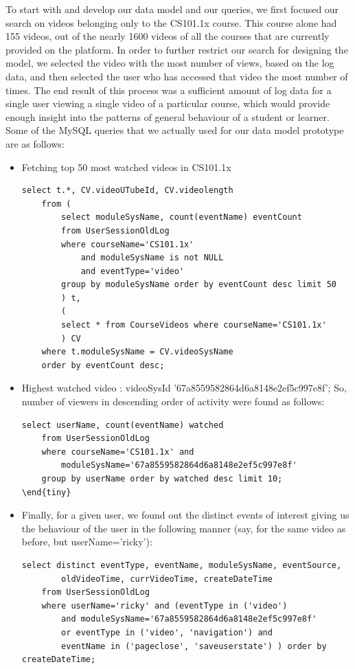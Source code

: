 \documentclass[16pt]{report}
\begin{document}
To start with and develop our data model and our queries, we first focused our search on videos belonging only to the CS101.1x course. This course alone had 155 videos, out of the nearly 1600 videos of all the courses that are currently provided on the platform. In order to further restrict our search for designing the model, we selected the video with the most number of views, based on the log data, and then selected the user who has accessed that video the most number of times. The end result of this process was a sufficient amount of log data for a single user viewing a single video of a particular course, which would provide enough insight into the patterns of general behaviour of a student or learner. \\

Some of the MySQL queries that we actually used for our data model prototype are as follows:

\begin{itemize}

\item Fetching top 50 most watched videos in CS101.1x
\begin{verbatim}
select t.*, CV.videoUTubeId, CV.videolength
	from ( 	
		select moduleSysName, count(eventName) eventCount
		from UserSessionOldLog
		where courseName='CS101.1x' 
			and moduleSysName is not NULL
			and eventType='video'
		group by moduleSysName order by eventCount desc limit 50
		) t,
		(
		select * from CourseVideos where courseName='CS101.1x'
		) CV
	where t.moduleSysName = CV.videoSysName
	order by eventCount desc;
\end{verbatim}


\item Highest watched video : videoSysId '67a8559582864d6a8148e2ef5c997e8f'; So, number of viewers in descending order of activity were found as follows:

\begin{verbatim}
select userName, count(eventName) watched
	from UserSessionOldLog
	where courseName='CS101.1x' and
		moduleSysName='67a8559582864d6a8148e2ef5c997e8f'
	group by userName order by watched desc limit 10;
\end{tiny}

\end{verbatim}

\item Finally, for a given user, we found out the distinct events of interest giving us the behaviour of the user in the following manner (say, for the same video as before, but userName='ricky'):

\begin{verbatim}
select distinct	eventType, eventName, moduleSysName, eventSource, 
		oldVideoTime, currVideoTime, createDateTime 
	from UserSessionOldLog 
	where userName='ricky' and (eventType in ('video') 
		and moduleSysName='67a8559582864d6a8148e2ef5c997e8f' 
		or eventType in ('video', 'navigation') and 
		eventName in ('pageclose', 'saveuserstate') ) order by createDateTime;
\end{verbatim}


\end{itemize}
\end{document}
